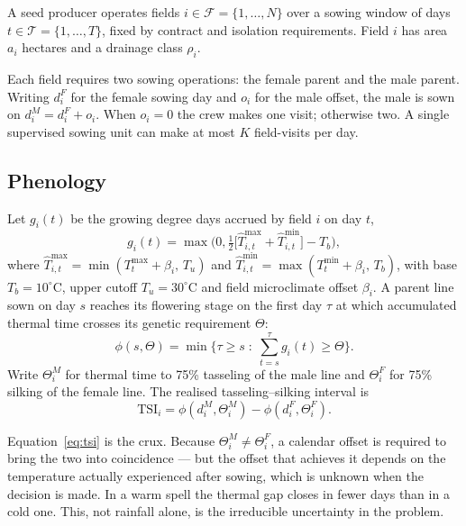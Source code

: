 \documentclass[10pt,twocolumn]{article}
\newcommand{\TSI}{\mathrm{TSI}}
\begin{document}
A seed producer operates fields $i \in \mathcal{F} = \{1,\dots,N\}$ over a
sowing window of days $t \in \mathcal{T} = \{1,\dots,T\}$, fixed by contract
and isolation requirements. Field $i$ has area $a_i$ hectares and a drainage
class $\rho_i$.

Each field requires two sowing operations: the female parent and the male
parent. Writing $d^F_i$ for the female sowing day and $o_i$ for the male
offset, the male is sown on $d^M_i = d^F_i + o_i$. When $o_i = 0$ the crew
makes one visit; otherwise two. A single supervised sowing unit can make at
most $K$ field-visits per day.

\subsection{Phenology}

Let $g_i(t)$ be the growing degree days accrued by field $i$ on day $t$,
\begin{equation}
g_i(t) = \max\!\Big(0, \tfrac{1}{2}\big[\widehat{T}^{\max}_{i,t}
      + \widehat{T}^{\min}_{i,t}\big] - T_b\Big),
\end{equation}
where $\widehat{T}^{\max}_{i,t} = \min(T^{\max}_t + \beta_i,\,T_u)$ and
$\widehat{T}^{\min}_{i,t} = \max(T^{\min}_t + \beta_i,\,T_b)$, with base
$T_b = 10^\circ$C, upper cutoff $T_u = 30^\circ$C and field microclimate
offset $\beta_i$. A parent line sown on day $s$ reaches its
flowering stage on the first day $\tau$ at which accumulated thermal time
crosses its genetic requirement $\Theta$:
\begin{equation}
\phi(s,\Theta) = \min\Big\{\tau \ge s \;:\; \textstyle\sum_{t=s}^{\tau} g_i(t) \ge \Theta \Big\}.
\end{equation}
Write $\Theta^M_i$ for thermal time to 75\% tasseling of the male line and
$\Theta^F_i$ for 75\% silking of the female line. The realised
tasseling--silking interval is
\begin{equation}
\TSI_i = \phi(d^M_i, \Theta^M_i) - \phi(d^F_i, \Theta^F_i).
\label{eq:tsi}
\end{equation}

Equation~\eqref{eq:tsi} is the crux. Because $\Theta^M_i \ne \Theta^F_i$, a
calendar offset is required to bring the two into coincidence --- but the
offset that achieves it depends on the temperature actually experienced after
sowing, which is unknown when the decision is made. In a warm spell the
thermal gap closes in fewer days than in a cold one. This, not rainfall alone,
is the irreducible uncertainty in the problem.
\end{document}
